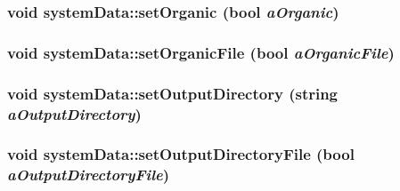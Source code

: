 \label{classsystem_data_ac5f549e017b249ee28cc205dd447927f}
\hypertarget{classsystem_data_a00284a739378bb2a6839a93c071dcf18}{
\subsubsection[{setOrganic}]{\setlength{\rightskip}{0pt plus 5cm}void systemData::setOrganic (bool {\em aOrganic})}}
\label{classsystem_data_a00284a739378bb2a6839a93c071dcf18}
\hypertarget{classsystem_data_abe13481b03a050e7d2b40b46c0837279}{
\subsubsection[{setOrganicFile}]{\setlength{\rightskip}{0pt plus 5cm}void systemData::setOrganicFile (bool {\em aOrganicFile})}}
\label{classsystem_data_abe13481b03a050e7d2b40b46c0837279}
\hypertarget{classsystem_data_aa7d3df6c6a8bee4bce2f27a8a4cf16e1}{
\subsubsection[{setOutputDirectory}]{\setlength{\rightskip}{0pt plus 5cm}void systemData::setOutputDirectory (string {\em aOutputDirectory})}}
\label{classsystem_data_aa7d3df6c6a8bee4bce2f27a8a4cf16e1}
\hypertarget{classsystem_data_a4f7c590ce282999bcbcb24d4a260be36}{
\subsubsection[{setOutputDirectoryFile}]{\setlength{\rightskip}{0pt plus 5cm}void systemData::setOutputDirectoryFile (bool {\em aOutputDirectoryFile})}}
\label{classsystem_data_a4f7c590ce282999bcbcb24d4a260be36}
